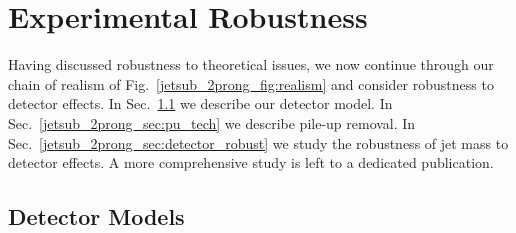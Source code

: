 \documentclass[11pt,letterpaper]{article}
\begin{document}
\section{Experimental Robustness}\label{jetsub_2prong_sec:exp}

Having discussed robustness to theoretical issues, we now continue through our chain of realism of Fig.~\ref{jetsub_2prong_fig:realism} and consider robustness to detector effects.
%
In Sec.~\ref{jetsub_2prong_sec:det_model} we describe our detector model.
%
In Sec.~\ref{jetsub_2prong_sec:pu_tech} we describe pile-up removal.
%
In Sec.~\ref{jetsub_2prong_sec:detector_robust} we study the robustness of jet mass to detector effects.
%
A more comprehensive study is left to a dedicated publication.

\subsection{Detector Models}\label{jetsub_2prong_sec:det_model}
\end{document}
